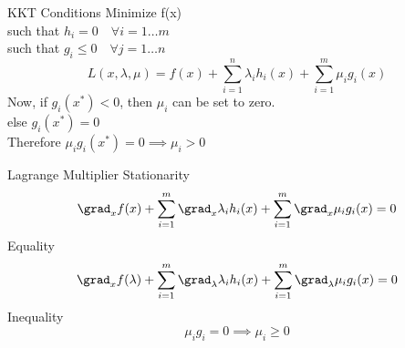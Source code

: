 \documentclass{beamer}
\begin{document}
\begin{frame}{KKT Conditions}
    Minimize f(x)\\
    such that $h_{i} = 0 \hspace{1em} \forall i = 1 \dots m$\\
    such that $g_{i} \leq 0 \hspace{1em} \forall j = 1 \dots n$\\
    
    \begin{equation*}
        L(x,\lambda,\mu)= f(x) + \sum_{i=1}^{n}\lambda_{i}h_{i}(x) + 
        \sum_{i=1}^{m}\mu_{i}g_{i}(x) 
    \end{equation*}
    Now, if $g_{i}(x^{*})<0$, then $\mu_{i}$ can be set to zero.\\
    else  $g_{i}(x^{*})=0$\\
    Therefore $\mu_{i}g_{i}(x^{*})=0 \implies \mu_{i}>0$
\end{frame}


\begin{frame}{Lagrange Multiplier}
    Stationarity\\
    \begin{equation*}
        \grad_{x}f(x) + \sum_{i=1}^{m} \grad_{x}\lambda_{i}h_{i}(x)+\sum_{i=1}^{m}\grad_{x}\mu_{i}g_{i}(x)=0\\
    \end{equation*}
    Equality
    \begin{equation*}
        \grad_{x}f(\lambda) + \sum_{i=1}^{m} \grad_{\lambda}\lambda_{i}h_{i}(x)+\sum_{i=1}^{m}\grad_{\lambda}\mu_{i}g_{i}(x)=0\\
    \end{equation*}
    Inequality
    \begin{equation*}
        \mu_{i}g_{i}=0 \implies \mu_{i} \geq 0
    \end{equation*}
\end{frame}
\end{document}
